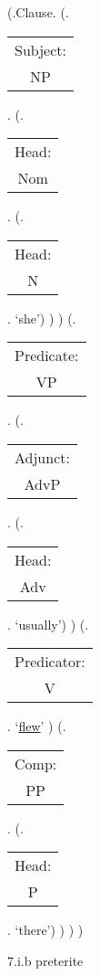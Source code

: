 \documentclass[12pt,letterpaper]{article}
\begin{document}
\begin{figure}
	\begin{center}
		\begin{parsetree}
			(.Clause.
			(.\begin{tabular}{c}Subject:\\NP\end{tabular}.  
			(.\begin{tabular}{c}Head:\\Nom\end{tabular}.
			(.\begin{tabular}{c}Head:\\N\end{tabular}. `she')
			)
			)
			(.\begin{tabular}{c}Predicate:\\VP\end{tabular}.
			(.\begin{tabular}{c}Adjunct:\\AdvP\end{tabular}.
			(.\begin{tabular}{c}Head:\\Adv\end{tabular}. `usually')
			)
			(.\begin{tabular}{c}Predicator:\\V\end{tabular}.    `\underline{flew}' )
			(.\begin{tabular}{c}Comp:\\PP\end{tabular}. 
			(.\begin{tabular}{c}Head:\\P\end{tabular}. `there')
			)
			)
			)
			
		\end{parsetree}
		\hfill \break \hfill \break
		7.i.b preterite
	\end{center}
\end{figure}	
\end{document}
